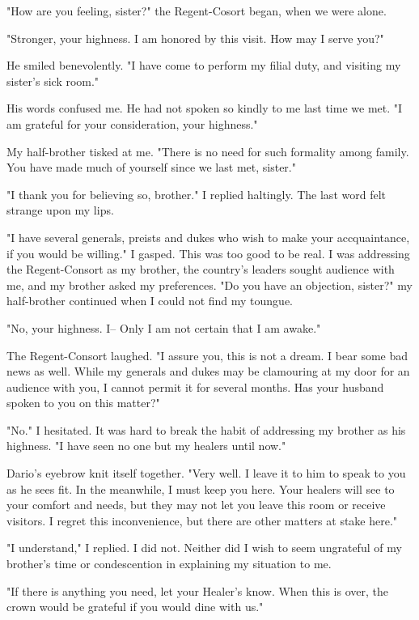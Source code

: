 \documentclass{article}
\begin{document}
"How are you feeling, sister?" the Regent-Cosort began, when we were alone.

"Stronger, your highness. I am honored by this visit. How may I serve you?"

He smiled benevolently. "I have come to perform my filial duty, and visiting my sister's sick room."

His words confused me. He had not spoken so kindly to me last time we met. "I am grateful for your consideration, your highness."

My half-brother tisked at me. "There is no need for such formality among family. You have made much of yourself since we last met, sister."

"I thank you for believing so, brother." I replied haltingly. The last word felt strange upon my lips. 

"I have several generals, preists and dukes who wish to make your accquaintance, if you would be willing." I gasped. This was too good to be real. I was addressing the Regent-Consort as my brother, the country's leaders sought audience with me, and my brother asked my preferences. "Do you have an objection, sister?" my half-brother continued when I could not find my toungue.

"No, your highness. I-- Only I am not certain that I am awake."

The Regent-Consort laughed. "I assure you, this is not a dream. I bear some bad news as well. While my generals and dukes may be clamouring at my door for an audience with you, I cannot permit it for several months. Has your husband spoken to you on this matter?"

"No." I hesitated. It was hard to break the habit of addressing my brother as his highness. "I have seen no one but my healers until now."

Dario's eyebrow knit itself together. "Very well. I leave it to him to speak to you as he sees fit. In the meanwhile, I must keep you here. Your healers will see to your comfort and needs, but they may not let you leave this room or receive visitors. I regret this inconvenience, but there are other matters at stake here."

"I understand," I replied. I did not. Neither did I wish to seem ungrateful of my brother's time or condescention in explaining my situation to me. 

"If there is anything you need, let your Healer's know. When this is over, the crown would be grateful if you would dine with us."
\end{document}

